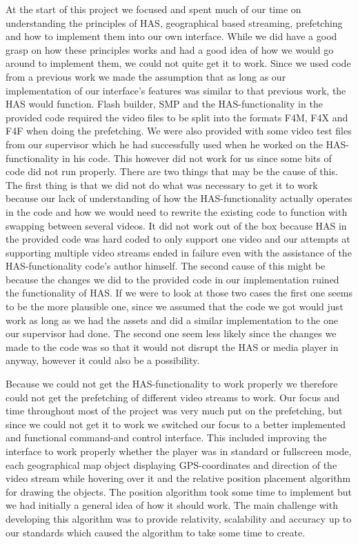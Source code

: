 At the start of this project we focused and spent much of our time on understanding the principles of HAS, geographical based streaming, prefetching and how to implement them into our own interface. While we did have a good grasp on how these principles works and had a good idea of how we would go around to implement them, we could not quite get it to work. Since we used code from a previous work we made the assumption that as long as our implementation of our interface's features was similar to that previous work, the HAS would function. Flash builder, SMP and the HAS-functionality in the provided code required the video files to be split into the formats F4M, F4X and F4F when doing the prefetching. We were also provided with some video test files from our supervisor which he had successfully used when he worked on the HAS-functionality in his code. This however did not work for us since some bits of code did not run properly. There are two things that may be the cause of this. The first thing is that we did not do what was necessary to get it to work because our lack of understanding of how the HAS-functionality actually operates in the code and how we would need to rewrite the existing code to function with swapping between several videos. It did not work out of the box because HAS in the provided code was hard coded to only support one video and our attempts at supporting multiple video streams ended in failure even with the assistance of the HAS-functionality code's author himself. The second cause of this might be because the changes we did to the provided code in our implementation ruined the functionality of HAS. If we were to look at those two cases the first one seems to be the more plausible one, since we assumed that the code we got would just work as long as we had the assets and did a similar implementation to the one our supervisor had done. The second one seem less likely since the changes we made to the code was so that it would not disrupt the HAS or media player in anyway, however it could also be a possibility. 

Because we could not get the HAS-functionality to work properly we therefore could not get the prefetching of different video streams to work. Our focus and time throughout most of the project was very much put on the prefetching, but since we could not get it to work we switched our focus to a better implemented and functional command-and control interface. This included improving the interface to work properly whether the player was in standard or fullscreen mode, each geographical map object displaying GPS-coordinates and direction of the video stream while hovering over it and the relative position placement algorithm for drawing the objects. The position algorithm took some time to implement but we had initially a general idea of how it should work. The main challenge with developing this algorithm was to provide relativity, scalability and accuracy up to our standards which caused the algorithm to take some time to create.

